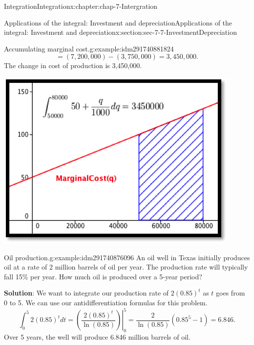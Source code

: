 \documentclass[oneside,10pt,]{book}
\newcommand{\terminology}[1]{\textbf{#1}}
\numberwithin{equation}{section}
\begin{document}
\begin{chapterptx}{Integration}{}{Integration}{}{}{x:chapter:chap-7-Intergration}
\begin{sectionptx}{Applications of the integral: Investment and depreciation}{}{Applications of the integral: Investment and depreciation}{}{}{x:section:sec-7-7-InvestmentDepreciation}
\begin{example}{Accumulating marginal cost.}{g:example:idm291740881824}
\begin{equation*}
=(7,200,000)-(3,750,000)=3,450,000.
\end{equation*}
The change in cost of production is \textdollar{}3,450,000.%
\begin{sidebyside}{1}{0.25}{0.25}{0}%
\begin{sbspanel}{0.5}%
\includegraphics[width=\linewidth]{images/sec7-7-2.png}
\end{sbspanel}%
\end{sidebyside}%
\end{example}
\begin{example}{Oil production.}{g:example:idm291740876096}%
An oil well in Texas initially produces oil at a rate of 2 million barrels of oil per year.  The production rate will typically fall 15\% per year.  How much oil is produced over a 5-year period?%
\par
\terminology{Solution}: We want to integrate our production rate of \(2(0.85)^t\) as \(t\) goes from 0 to 5.  We can use our antidifferentiation formulas for this problem.%
%
\begin{equation*}
\int_0^5 2(0.85)^t   dt= \left.\left(\frac{2(0.85)^t}{\ln (0.85)}\right)\right|_0^5=\frac{2}{\ln (0.85)}  (0.85^5-1)=6.846.
\end{equation*}
Over 5 years, the well will produce 6.846 million barrels of oil.%
\begin{sidebyside}{1}{0.3}{0.3}{0}%
\begin{sbspanel}{0.4}%

\end{sbspanel}
\end{sidebyside}
\end{example}
\end{sectionptx}
\end{chapterptx}
\end{document}
